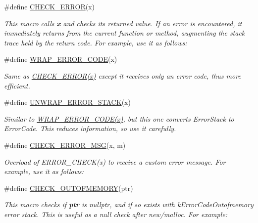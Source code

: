 \begin{DoxyCompactItemize}
\#define \hyperlink{group__ERRORCODES_ga72a80915c3588aea09c053ab567e19c4}{C\+H\+E\+C\+K\+\_\+\+E\+R\+R\+OR}(x)
\begin{DoxyCompactList}\small\item\em This macro calls {\bfseries x} and checks its returned value. If an error is encountered, it immediately returns from the current function or method, augmenting the stack trace held by the return code. For example, use it as follows\+: \end{DoxyCompactList}\item 
\#define \hyperlink{group__ERRORCODES_ga952ce4f5f860d7b28a70095b450d3f4d}{W\+R\+A\+P\+\_\+\+E\+R\+R\+O\+R\+\_\+\+C\+O\+DE}(x)
\begin{DoxyCompactList}\small\item\em Same as \hyperlink{group__ERRORCODES_ga72a80915c3588aea09c053ab567e19c4}{C\+H\+E\+C\+K\+\_\+\+E\+R\+R\+O\+R(x)} except it receives only an error code, thus more efficient. \end{DoxyCompactList}\item 
\#define \hyperlink{group__ERRORCODES_ga4ee877172bb56ddb8b6221537ab0e4ab}{U\+N\+W\+R\+A\+P\+\_\+\+E\+R\+R\+O\+R\+\_\+\+S\+T\+A\+CK}(x)
\begin{DoxyCompactList}\small\item\em Similar to \hyperlink{group__ERRORCODES_ga952ce4f5f860d7b28a70095b450d3f4d}{W\+R\+A\+P\+\_\+\+E\+R\+R\+O\+R\+\_\+\+C\+O\+D\+E(x)}, but this one converts Error\+Stack to Error\+Code. This reduces information, so use it carefully. \end{DoxyCompactList}\item 
\#define \hyperlink{group__ERRORCODES_gab7af3b4927e4ef68ce0ddf76e93cd3b1}{C\+H\+E\+C\+K\+\_\+\+E\+R\+R\+O\+R\+\_\+\+M\+SG}(x,  m)
\begin{DoxyCompactList}\small\item\em Overload of E\+R\+R\+O\+R\+\_\+\+C\+H\+E\+C\+K(x) to receive a custom error message. For example, use it as follows\+: \end{DoxyCompactList}\item 
\#define \hyperlink{group__ERRORCODES_ga45dae2ea7a9e0bc6aa3b3139c4bcf1dd}{C\+H\+E\+C\+K\+\_\+\+O\+U\+T\+O\+F\+M\+E\+M\+O\+RY}(ptr)
\begin{DoxyCompactList}\small\item\em This macro checks if {\bfseries ptr} is nullptr, and if so exists with k\+Error\+Code\+Outofmemory error stack. This is useful as a null check after new/malloc. For example\+: \end{DoxyCompactList}\item 

\end{DoxyCompactItemize}
